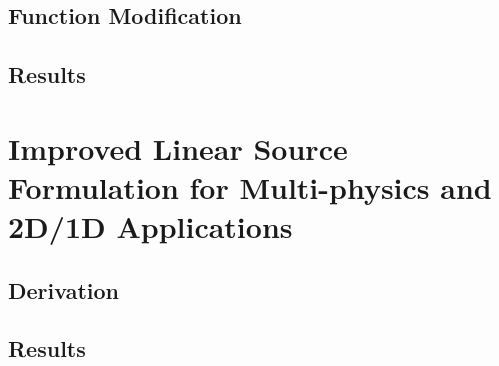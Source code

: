 {{    \subsection{Function Modification}{\label{ssec:LSMOC:ET:Function Modification}
      \blindtext[5]
    }
    \subsection{Results}{\label{ssec:LSMOC:ET:Results}
      \blindtext[5]
    }
  }
  \section{Improved Linear Source Formulation for Multi-physics and 2D/1D Applications}{\label{sec:Improved Linear Source Formulation for Multi-physics and 2D/1D Applications}
    \blindtext
    \subsection{Derivation}{\label{ssec:LSMOC:Derivation}
      \blindtext[5]
    }
    \subsection{Results}{\label{ssec:LSMOC:Results}
      \blindtext[5]
    }
  }


  \printbibliography
}


